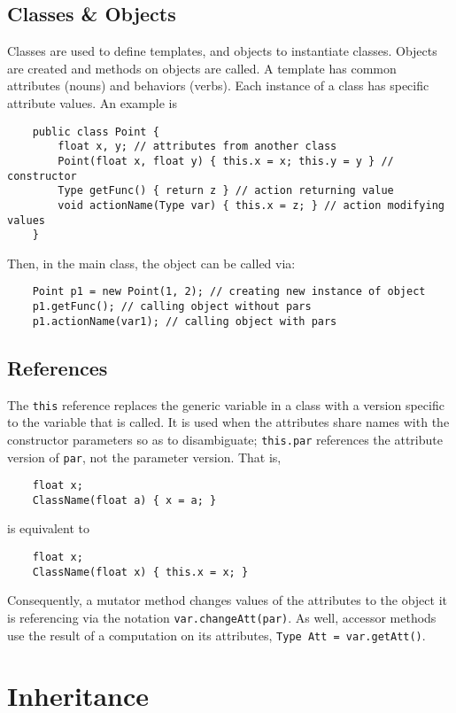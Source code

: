 \documentclass[letterpaper, openany, justified]{tufte-book}
\newcommand{\cd}[1]{\lstinline{#1}}
\begin{document}
\begin{fullwidth}
\section{Classes \& Objects}
Classes are used to define templates, and objects to instantiate classes. Objects are created and methods on objects are called. A template has common attributes (nouns) and behaviors (verbs). Each instance of a class has specific attribute values. An example is
\begin{lstlisting}
    public class Point {
        float x, y; // attributes from another class
        Point(float x, float y) { this.x = x; this.y = y } // constructor
        Type getFunc() { return z } // action returning value
        void actionName(Type var) { this.x = z; } // action modifying values
    }
\end{lstlisting}
Then, in the main class, the object can be called via:
\begin{lstlisting}
    Point p1 = new Point(1, 2); // creating new instance of object
    p1.getFunc(); // calling object without pars
    p1.actionName(var1); // calling object with pars
\end{lstlisting}

\section{References}
The \cd{this} reference replaces the generic variable in a class with a version specific to the variable that is called. It is used when the attributes share names with the constructor parameters so as to disambiguate; \cd{this.par} references the attribute version of \cd{par}, not the parameter version. That is,
\begin{lstlisting}
    float x;
    ClassName(float a) { x = a; }
\end{lstlisting}
is equivalent to
\begin{lstlisting}
    float x;
    ClassName(float x) { this.x = x; }
\end{lstlisting}
Consequently, a mutator method changes values of the attributes to the object it is referencing via the notation \cd{var.changeAtt(par)}. As well, accessor methods use the result of a computation on its attributes, \cd{Type Att = var.getAtt()}.

\chapter{Inheritance}


\end{fullwidth}
\end{document}
